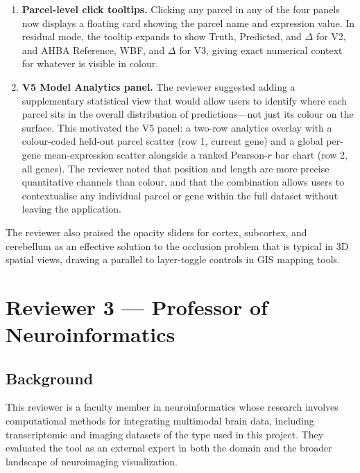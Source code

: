 \documentclass[11pt,letterpaper]{article}
\begin{document}
\begin{enumerate}[nosep]
  \item \textbf{Parcel-level click tooltips.}
        Clicking any parcel in any of the four panels now displays a floating
        card showing the parcel name and expression value.
        In residual mode, the tooltip expands to show Truth, Predicted, and
        $\Delta$ for V2, and AHBA Reference, WBF, and $\Delta$ for V3,
        giving exact numerical context for whatever is visible in colour.

  \item \textbf{V5 Model Analytics panel.}
        The reviewer suggested adding a supplementary statistical view that
        would allow users to identify where each parcel sits in the overall
        distribution of predictions---not just its colour on the surface.
        This motivated the V5 panel: a two-row analytics overlay with a
        colour-coded held-out parcel scatter (row 1, current gene) and a
        global per-gene mean-expression scatter alongside a ranked
        Pearson-$r$ bar chart (row 2, all genes).
        The reviewer noted that position and length are more precise
        quantitative channels than colour, and that the combination allows
        users to contextualise any individual parcel or gene within the
        full dataset without leaving the application.
\end{enumerate}

The reviewer also praised the opacity sliders for cortex, subcortex, and
cerebellum as an effective solution to the occlusion problem that is typical
in 3D spatial views, drawing a parallel to layer-toggle controls in GIS
mapping tools.

\section{Reviewer 3 — Professor of Neuroinformatics}

\subsection*{Background}

This reviewer is a faculty member in neuroinformatics whose research involves
computational methods for integrating multimodal brain data, including
transcriptomic and imaging datasets of the type used in this project.
They evaluated the tool as an external expert in both the domain and the
broader landscape of neuroimaging visualization.
\end{document}
